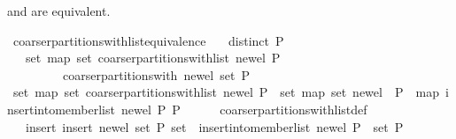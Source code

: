 \begin{isabellebody}
\begin{isamarkuptext}%
 and  are equivalent.%
\end{isamarkuptext}%
\isamarkuptrue%
\isamarkupfalse%
\ coarser{\isacharunderscore}partitions{\isacharunderscore}with{\isacharunderscore}list{\isacharunderscore}equivalence{\isacharcolon}\isanewline
\ \ \ {\isachardoublequoteopen}distinct\ P{\isachardoublequoteclose}\isanewline
\ \ \ {\isachardoublequoteopen}set\ {\isacharparenleft}map\ set\ {\isacharparenleft}coarser{\isacharunderscore}partitions{\isacharunderscore}with{\isacharunderscore}list\ new{\isacharunderscore}el\ P{\isacharparenright}{\isacharparenright}\ {\isacharequal}\ \isanewline
\ \ \ \ \ \ \ \ \ coarser{\isacharunderscore}partitions{\isacharunderscore}with\ new{\isacharunderscore}el\ {\isacharparenleft}set\ P{\isacharparenright}{\isachardoublequoteclose}\isanewline
%
\isadelimproof
%
\endisadelimproof
%
\isatagproof
{}\isamarkupfalse%
\ {\isacharminus}\isanewline
\ \ \isamarkupfalse%
\ {\isachardoublequoteopen}set\ {\isacharparenleft}map\ set\ {\isacharparenleft}coarser{\isacharunderscore}partitions{\isacharunderscore}with{\isacharunderscore}list\ new{\isacharunderscore}el\ P{\isacharparenright}{\isacharparenright}\ {\isacharequal}\ set\ {\isacharparenleft}map\ set\ {\isacharparenleft}{\isacharparenleft}{\isacharbraceleft}new{\isacharunderscore}el{\isacharbraceright}\ {\isacharhash}\ P{\isacharparenright}\ {\isacharhash}\ {\isacharparenleft}map\ {\isacharparenleft}{\isacharparenleft}insert{\isacharunderscore}into{\isacharunderscore}member{\isacharunderscore}list\ new{\isacharunderscore}el\ P{\isacharparenright}{\isacharparenright}\ P{\isacharparenright}{\isacharparenright}{\isacharparenright}{\isachardoublequoteclose}\isanewline
\ \ \ \ \isamarkupfalse%
\ coarser{\isacharunderscore}partitions{\isacharunderscore}with{\isacharunderscore}list{\isacharunderscore}def\ \isacommand{{\isachardot}{\isachardot}}\isamarkupfalse%
\isanewline
\ \ \isamarkupfalse%
\ \isamarkupfalse%
\ {\isachardoublequoteopen}{\isasymdots}\ {\isacharequal}\ insert\ {\isacharparenleft}insert\ {\isacharbraceleft}new{\isacharunderscore}el{\isacharbraceright}\ {\isacharparenleft}set\ P{\isacharparenright}{\isacharparenright}\ {\isacharparenleft}{\isacharparenleft}set\ {\isasymcirc}\ {\isacharparenleft}insert{\isacharunderscore}into{\isacharunderscore}member{\isacharunderscore}list\ new{\isacharunderscore}el\ P{\isacharparenright}{\isacharparenright}\ {\isacharbackquote}\ set\ P{\isacharparenright}{\isachardoublequoteclose}\isanewline

\end{isabellebody}
